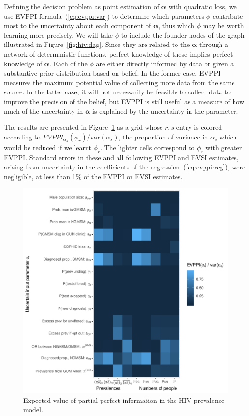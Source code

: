 \documentclass[12pt]{article}\usepackage[]{graphicx}\usepackage[]{color}
\makeatletter
\def\maxwidth{ %
  \ifdim\Gin@nat@width>\linewidth
    \linewidth
  \else
    \Gin@nat@width
  \fi
}
\newenvironment{knitrout}{}{} %
\newcommand{\var}{\mbox{var}}
\makeatother
\begin{document}
Defining the decision problem as point estimation of $\bm\alpha$ with quadratic loss, we use EVPPI formula~(\ref{eq:evppi:var}) to determine which parameters $\phi$ contribute most to the uncertainty about each component of $\bm\alpha$, thus which $\phi$ may be worth learning more precisely.   We will take $\phi$ to include the founder nodes of the graph illustrated in Figure~\ref{fig:hiv:dag}.  Since they are related to the $\bm\alpha$ through a network of deterministic functions, perfect knowledge of these implies perfect knowledge of $\bm\alpha$.  Each of the $\phi$ are either directly informed by data or given a substantive prior distribution based on belief.   In the former case, EVPPI measures the maximum potential value of collecting more data from the same source.   In the latter case, it will not necessarily be feasible to collect data to improve the precision of the belief, but EVPPI is still useful as a measure of how much of the uncertainty in $\bm\alpha$ is explained by the uncertainty in the parameter.

The results are presented in Figure~\ref{fig:res:evppi} as a grid whose $r,s$ entry is colored according to $EVPPI_{\alpha_s}(\phi_r) / \var(\alpha_s)$, the proportion of variance in $\alpha_s$ which would be reduced if we learnt $\phi_r$.  The lighter cells correspond to $\phi_r$ with greater EVPPI.  Standard errors in these and all following EVPPI and EVSI estimates, arising from uncertainty in the coefficients of the regression~(\ref{eq:evppi:reg}), were negligible, at less than 1\% of the EVPPI or EVSI estimates.

\begin{figure}
\begin{knitrout}
\color{fgcolor}
\includegraphics[width=\maxwidth]{figure/evppi-1} 

\end{knitrout}
  \caption{Expected value of partial perfect information in the HIV prevalence model.}
  \label{fig:res:evppi}
\end{figure}
\end{document}
